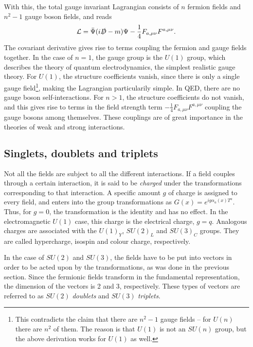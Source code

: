 With this, the total gauge invariant Lagrangian consists of $n$ fermion fields and $n^2-1$ gauge boson fields, and reads
\begin{align}
	\mathcal{L} = \bar\Psi(i\slashed D - m)\Psi - \frac{1}{4} F_{a,\mu\nu} F^{a,\mu\nu}.
\end{align}
The covariant derivative gives rise to terms coupling the fermion and gauge fields together. In the case of $n=1$, the gauge group is the $U(1)$ group, which describes the theory of quantum electrodynamics, the simplest realistic gauge theory. For $U(1)$, the structure coefficients vanish, since there is only a single gauge field\footnote{This contradicts the claim that there are $n^2-1$ gauge fields -- for $U(n)$ there are $n^2$ of them. The reason is that $U(1)$ is not an $SU(n)$ group, but the above derivation works for $U(1)$ as well.}, making the Lagrangian particularily simple. In QED, there are no gauge boson self-interactions. For $n>1$, the structure coefficients do not vanish, and this gives rise to terms in the field strength term $-\frac{1}{4} F_{a,\mu\nu} F^{a,\mu\nu}$ coupling the gauge bosons among themselves. These couplings are of great importance in the theories of weak and strong interactions.




\subsection{Singlets, doublets and triplets}

Not all the fields are subject to all the different interactions. If a field couples through a certain interaction, it is said to be {\it charged} under the transformations corresponding to that interaction. A specific amount $g$ of charge is assigned to every field, and enters into the group transformations as $G(x) = e^{ig\alpha_a(x)T^a}$. Thus, for $g=0$, the transformation is the identity and has no effect.  In the electromagnetic $U(1)$ case, this charge is the electrical charge, $g=q$. Analogous charges are associated with the $U(1)_Y$, $SU(2)_L$ and $SU(3)_C$ groups. They are called hypercharge, isospin and colour charge, respectively.

In the case of $SU(2)$ and $SU(3)$, the fields have to be put into vectors in order to be acted upon by the transformations, as was done in the previous section. Since the fermionic fields transform in the fundamental representation, the dimension of the vectors is 2 and 3, respectively. These types of vectors are referred to as $SU(2)$ {\it doublets} and $SU(3)$ {\it triplets}.

